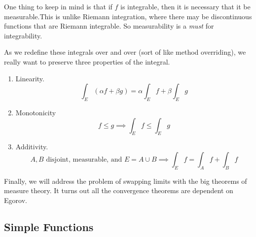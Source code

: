   One thing to keep in mind is that if $f$ is integrable, then it is necessary that it be measurable.This is unlike Riemann integration, where there may be discontinuous functions that are Riemann integrable. So measurability is a \textit{must} for integrability. 

  As we redefine these integrals over and over (sort of like method overriding), we really want to preserve three properties of the integral. 
  \begin{enumerate}
    \item Linearity. 
      \begin{equation}
        \int_E (\alpha f + \beta g) = \alpha \int_E f + \beta \int_E g 
      \end{equation}

    \item Monotonicity 
      \begin{equation}
        f \leq g \implies \int_E f \leq \int_E g 
      \end{equation}

    \item Additivity. 
      \begin{equation}
        A, B \text{ disjoint, measurable, and } E = A \cup B \implies \int_E f = \int_A f + \int_B f
      \end{equation}
  \end{enumerate}

  Finally, we will address the problem of swapping limits with the big theorems of measure theory. It turns out all the convergence theorems are dependent on Egorov. 

\subsection{Simple Functions} 

